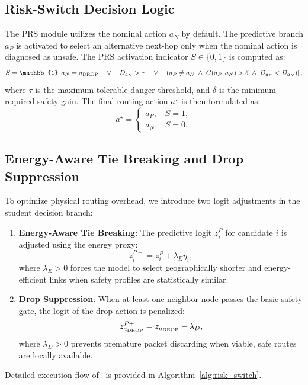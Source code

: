 \subsection{Risk-Switch Decision Logic}
The PRS module utilizes the nominal action $a_N$ by default. The predictive branch $a_P$ is activated to select an alternative next-hop only when the nominal action is diagnosed as unsafe. The PRS activation indicator $S \in \{0, 1\}$ is computed as:
\begin{equation}
    S = \mathbb{1}\left[ a_N = \dropact \quad \lor \quad D_{a_N} > \tau \quad \lor \quad \left( a_P \neq a_N \; \land \; G(a_P, a_N) > \delta \; \land \; D_{a_P} < D_{a_N} \right) \right],
\end{equation}
where $\tau$ is the maximum tolerable danger threshold, and $\delta$ is the minimum required safety gain. The final routing action $a^\star$ is then formulated as:
\begin{equation}
    a^\star = \begin{cases} a_P, & S = 1, \\ a_N, & S = 0. \end{cases}
\end{equation}

\subsection{Energy-Aware Tie Breaking and Drop Suppression}
To optimize physical routing overhead, we introduce two logit adjustments in the student decision branch:
\begin{enumerate}
    \item \textbf{Energy-Aware Tie Breaking}: The predictive logit $z_i^P$ for candidate $i$ is adjusted using the energy proxy:
    \begin{equation}
        z_i^{P+} = z_i^P + \lambda_E \eta_i,
    \end{equation}
    where $\lambda_E > 0$ forces the model to select geographically shorter and energy-efficient links when safety profiles are statistically similar.
    \item \textbf{Drop Suppression}: When at least one neighbor node passes the basic safety gate, the logit of the drop action is penalized:
    \begin{equation}
        z_{a_{\mathrm{DROP}}}^{P+} = z_{a_{\mathrm{DROP}}} - \lambda_D,
    \end{equation}
    where $\lambda_D > 0$ prevents premature packet discarding when viable, safe routes are locally available.
\end{enumerate}

Detailed execution flow of \method\ is provided in Algorithm~\ref{alg:risk_switch}.

